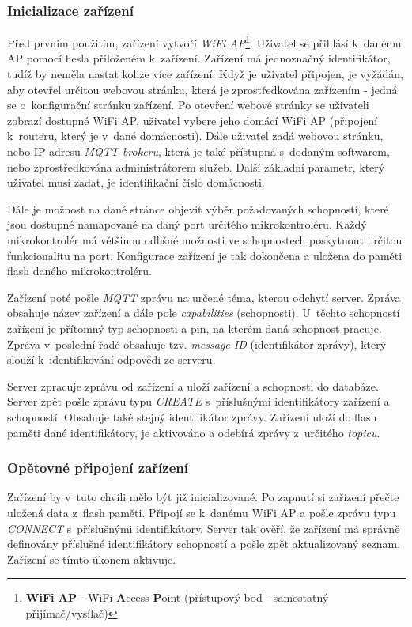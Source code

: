 \subsubsection*{Inicializace zařízení}
Před prvním použitím, zařízení vytvoří \emph{WiFi AP}\footnote{\textbf{WiFi AP} - WiFi \textbf{A}ccess \textbf{P}oint (přístupový bod - samostatný přijímač/vysílač)}.
Uživatel se přihlásí k~danému AP pomocí hesla přiloženém k~zařízení. Zařízení má jednoznačný identifikátor, tudíž by neměla nastat kolize více zařízení.
Když je uživatel připojen, je vyžádán, aby otevřel určitou webovou stránku, která je zprostředkována zařízením - jedná se o~konfigurační stránku zařízení.
Po otevření webové stránky se uživateli zobrazí dostupné WiFi AP, uživatel vybere jeho domácí WiFi AP (připojení k~routeru, který je v~dané domácnosti).
Dále uživatel zadá webovou stránku, nebo IP adresu \emph{MQTT brokeru}, která je také přístupná s~dodaným softwarem, nebo zprostředkována administrátorem služeb.
Další základní parametr, který uživatel musí zadat, je identifikační číslo domácnosti.

Dále je možnost na dané stránce objevit výběr požadovaných schopností, které jsou dostupné namapované na daný port určitého mikrokontroléru.
Každý mikrokontrolér má většinou odlišné možnosti ve schopnostech poskytnout určitou funkcionalitu na port.
Konfigurace zařízení je tak dokončena a uložena do paměti flash daného mikrokontroléru.

Zařízení poté pošle \emph{MQTT} zprávu na určené téma, kterou odchytí server. Zpráva obsahuje název zařízení a dále pole \emph{capabilities} (schopnosti).
U~těchto schopností zařízení je přítomný typ schopnosti a pin, na kterém daná schopnost pracuje.
Zpráva v~poslední řadě obsahuje tzv. \emph{message ID} (identifikátor zprávy), který slouží k~identifikování odpovědi ze serveru.

Server zpracuje zprávu od zařízení a uloží zařízení a schopnosti do databáze.
Server zpět pošle zprávu typu \emph{CREATE} s~příslušnými identifikátory zařízení a schopností.
Obsahuje také stejný identifikátor zprávy.
Zařízení uloží do flash paměti dané identifikátory, je aktivováno a odebírá zprávy z~určitého \emph{topicu}.

\subsubsection*{Opětovné připojení zařízení}
Zařízení by v~tuto chvíli mělo být již inicializované.
Po zapnutí si zařízení přečte uložená data z~flash paměti.
Připojí se k~danému WiFi AP a pošle zprávu typu \emph{CONNECT} s~příslušnými identifikátory.
Server tak ověří, že zařízení má správně definovány příslušné identifikátory schopností a pošle zpět aktualizovaný seznam.
Zařízení se tímto úkonem aktivuje.

